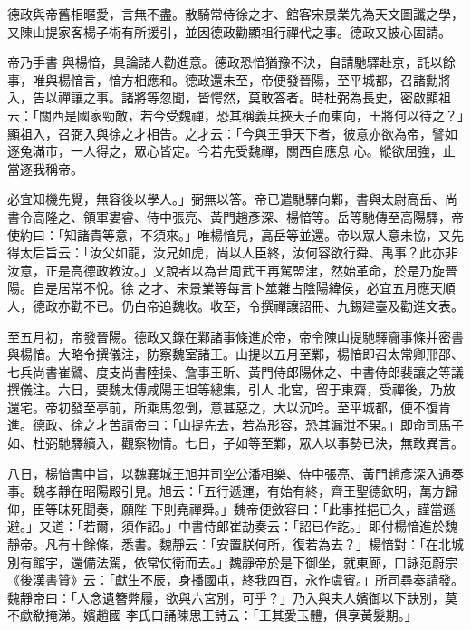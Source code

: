 \begin{pinyinscope}
 德政與帝舊相暱愛，言無不盡。散騎常侍徐之才、館客宋景業先為天文圖讖之學，又陳山提家客楊子術有所援引，並因德政勸顯祖行禪代之事。德政又披心固請。



 帝乃手書
 與楊愔，具論諸人勸進意。德政恐愔猶豫不決，自請馳驛赴京，託以餘事，唯與楊愔言，愔方相應和。德政還未至，帝便發晉陽，至平城都，召諸勳將入，告以禪讓之事。諸將等忽聞，皆愕然，莫敢答者。時杜弼為長史，密啟顯祖云：「關西是國家勁敵，若今受魏禪，恐其稱義兵挾天子而東向，王將何以待之？」顯祖入，召弼入與徐之才相告。之才云：「今與王爭天下者，彼意亦欲為帝，譬如逐兔滿市，一人得之，眾心皆定。今若先受魏禪，關西自應息
 心。縱欲屈強，止當逐我稱帝。



 必宜知機先覺，無容後以學人。」弼無以答。帝已遣馳驛向鄴，書與太尉高岳、尚書令高隆之、領軍婁睿、侍中張亮、黃門趙彥深、楊愔等。岳等馳傳至高陽驛，帝使約曰：「知諸貴等意，不須來。」唯楊愔見，高岳等並還。帝以眾人意未協，又先得太后旨云：「汝父如龍，汝兄如虎，尚以人臣終，汝何容欲行舜、禹事？此亦非汝意，正是高德政教汝。」又說者以為昔周武王再駕盟津，然始革命，於是乃旋晉陽。自是居常不悅。徐
 之才、宋景業等每言卜筮雜占陰陽緯侯，必宜五月應天順人，德政亦勸不已。仍白帝追魏收。收至，令撰禪讓詔冊、九錫建臺及勸進文表。



 至五月初，帝發晉陽。德政又錄在鄴諸事條進於帝，帝令陳山提馳驛齎事條并密書與楊愔。大略令撰儀注，防察魏室諸王。山提以五月至鄴，楊愔即召太常卿邢邵、七兵尚書崔鷿、度支尚書陸操、詹事王昕、黃門侍郎陽休之、中書侍郎裴讓之等議撰儀注。六日，要魏太傅咸陽王坦等總集，引人
 北宮，留于東齋，受禪後，乃放還宅。帝初發至亭前，所乘馬忽倒，意甚惡之，大以沉吟。至平城都，便不復肯進。德政、徐之才苦請帝曰：「山提先去，若為形容，恐其漏泄不果。」即命司馬子如、杜弼馳驛續入，觀察物情。七日，子如等至鄴，眾人以事勢已決，無敢異言。



 八日，楊愔書中旨，以魏襄城王旭并司空公潘相樂、侍中張亮、黃門趙彥深入通奏事。魏孝靜在昭陽殿引見。旭云：「五行遞運，有始有終，齊王聖德欽明，萬方歸仰，臣等昧死聞奏，願陛
 下則堯禪舜。」魏帝便斂容曰：「此事推挹已久，謹當遜避。」又道：「若爾，須作詔。」中書侍郎崔劼奏云：「詔已作訖。」即付楊愔進於魏靜帝。凡有十餘條，悉書。魏靜云：「安置朕何所，復若為去？」楊愔對：「在北城別有館宇，還備法駕，依常仗衛而去。」魏靜帝於是下御坐，就東廊，口詠范蔚宗《後漢書贊》云：「獻生不辰，身播國屯，終我四百，永作虞賓。」所司尋奏請發。魏靜帝曰：「人念遺簪弊屨，欲與六宮別，可乎？」乃入與夫人嬪御以下訣別，莫不歔欷掩涕。嬪趙國
 李氏口誦陳思王詩云：「王其愛玉體，俱享黃髮期。」




\end{pinyinscope}
